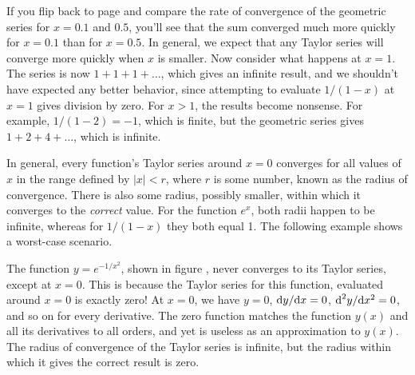 If you flip back to page \pageref{geometric-tenths} and compare the rate of convergence of the geometric
series for $x=0.1$ and $0.5$, you'll see that the sum converged 
much more quickly for $x=0.1$ than for $x=0.5$. In general, we expect
that any Taylor series will converge more quickly when $x$ is smaller. Now consider what happens at $x=1$. The series
is now $1+1+1+\ldots$, which gives an infinite result, and we shouldn't have expected any better behavior, since
attempting to evaluate $1/(1-x)$ at $x=1$ gives division by zero. For $x>1$, the results become nonsense.
For example, $1/(1-2)=-1$, which is finite, but the geometric series gives $1+2+4+\ldots$, which is infinite.

In general, every function's Taylor series around $x=0$ converges for all values of $x$ in the range
defined by $|x|<r$, where $r$ is some number, known as the radius of convergence.
There is also some radius, possibly smaller, within which it converges to the \emph{correct} value.
For the function $e^x$, both radii
happen to be infinite, whereas for $1/(1-x)$ they both equal 1. The following example shows a worst-case
scenario.


\begin{eg}
The function $y=e^{-1/x^2}$, shown in figure , never converges to its Taylor series, except at $x=0$.
This is because the Taylor series for this function, evaluated around $x=0$ is exactly zero! At $x=0$, we have
$y=0$, $\textup{d} y/\textup{d} x=0$, $\textup{d}^2 y/\textup{d} x^2=0$, and so on for every derivative. The zero function matches the function
$y(x)$ and all its derivatives to all orders, and yet is useless as an approximation to $y(x)$. The radius of convergence
of the Taylor series is infinite, but the radius within which it gives the correct result is zero.
\end{eg}

